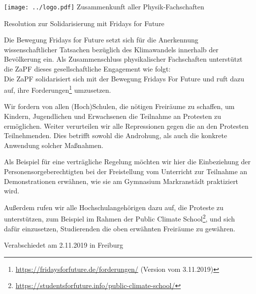 \documentclass[a4paper]{scrartcl}
\begin{document}
\hspace{0.87\textwidth}
\begin{minipage}{120pt}
  \vspace{-1.8cm}
  \texttt{[image: ../logo.pdf]}
  \centering
  \small Zusammenkunft aller Physik-Fachschaften
\end{minipage}
\begin{center}
  \vspace{1cm}
  \huge{Resolution zur Solidarisierung mit Fridays for Future} \\
  \normalsize
\end{center}
\vspace{1cm}

    Die Bewegung Fridays for Future setzt sich für die Anerkennung wissenschaftlicher Tatsachen bezüglich des Klimawandels innerhalb der Bevölkerung ein. Als Zusammenschluss physikalischer Fachschaften unterstützt die ZaPF dieses gesellschaftliche Engagement wie folgt:\\
    Die ZaPF solidarisiert sich mit der Bewegung \glqq{}Fridays For
    Future\grqq{} und ruft dazu auf, ihre Forderungen\footnote{\url{https://fridaysforfuture.de/forderungen/} (Version vom 3.11.2019)} umzusetzen.


    Wir fordern von allen (Hoch)Schulen, die nötigen Freiräume zu schaffen, um \\
    Kindern, Jugendlichen und Erwachsenen die Teilnahme an Protesten zu
    ermöglichen.  Weiter verurteilen wir alle Repressionen gegen die an den
    Protesten Teilnehmenden. Dies betrifft sowohl die Androhung, als auch die
    konkrete Anwendung solcher Maßnahmen.

    Als Beispiel für eine verträgliche
    Regelung möchten wir hier die Einbeziehung der Personensorgeberechtigten
    bei der Freistellung vom Unterricht zur Teilnahme an Demonstrationen
    erwähnen, wie sie am Gymnasium Markranstädt praktiziert wird.

    Außerdem rufen wir alle Hochschulangehörigen dazu auf, die Proteste zu
    unterstützen, zum Beispiel im Rahmen der Public Climate
    School\footnote{\url{https://studentsforfuture.info/public-climate-school/}}, und
    sich dafür einzusetzen, Studierenden die oben erwähnten Freiräume zu
    gewähren.

\vfill
\begin{flushright}
	Verabschiedet am 2.11.2019 in Freiburg
\end{flushright}
\end{document}
